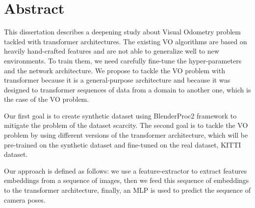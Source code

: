 
\cleardoublepage
{}
{}
\begingroup
\let\clearpage\relax
\let\cleardoublepage\relax
\let\cleardoublepage\relax

\chapter*{Abstract}

%
%
This dissertation describes a deepening study about Visual Odometry problem tackled with transformer architectures.
The existing VO algorithms are based on heavily hand-crafted features and are not able to generalize well to new environments.
To train them, we need carefully fine-tune the hyper-parameters and the network architecture.
We propose to tackle the VO problem with transformer because it is a general-purpose architecture and because it was designed to transformer sequences of data from a domain to another one, which is the case of the VO problem.

Our first goal is to create synthetic dataset using BlenderProc2 framework to mitigate the problem of the dataset scarcity.
The second goal is to tackle the VO problem by using different versions of the transformer architecture, which will be pre-trained on the synthetic dataset and fine-tuned on the real dataset, KITTI dataset.

Our approach is defined as follows: we use a feature-extractor to extract features embeddings from a sequence of images, then we feed this sequence of embeddings to the transformer architecture, finally, an MLP is used to predict the sequence of camera poses.
\endgroup

\vfill

